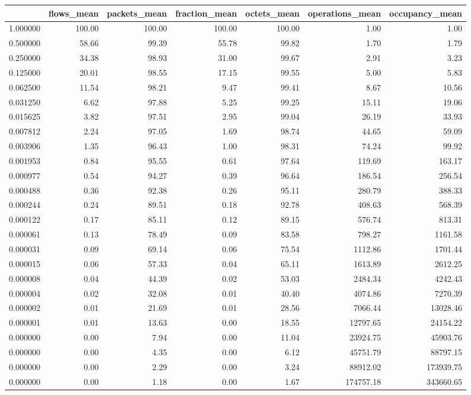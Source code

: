 \begin{tabular}{lrrrrrr}
\toprule
 & flows_mean & packets_mean & fraction_mean & octets_mean & operations_mean & occupancy_mean \\
\midrule
1.000000 & 100.00 & 100.00 & 100.00 & 100.00 & 1.00 & 1.00 \\
0.500000 & 58.66 & 99.39 & 55.78 & 99.82 & 1.70 & 1.79 \\
0.250000 & 34.38 & 98.93 & 31.00 & 99.67 & 2.91 & 3.23 \\
0.125000 & 20.01 & 98.55 & 17.15 & 99.55 & 5.00 & 5.83 \\
0.062500 & 11.54 & 98.21 & 9.47 & 99.41 & 8.67 & 10.56 \\
0.031250 & 6.62 & 97.88 & 5.25 & 99.25 & 15.11 & 19.06 \\
0.015625 & 3.82 & 97.51 & 2.95 & 99.04 & 26.19 & 33.93 \\
0.007812 & 2.24 & 97.05 & 1.69 & 98.74 & 44.65 & 59.09 \\
0.003906 & 1.35 & 96.43 & 1.00 & 98.31 & 74.24 & 99.92 \\
0.001953 & 0.84 & 95.55 & 0.61 & 97.64 & 119.69 & 163.17 \\
0.000977 & 0.54 & 94.27 & 0.39 & 96.64 & 186.54 & 256.54 \\
0.000488 & 0.36 & 92.38 & 0.26 & 95.11 & 280.79 & 388.33 \\
0.000244 & 0.24 & 89.51 & 0.18 & 92.78 & 408.63 & 568.39 \\
0.000122 & 0.17 & 85.11 & 0.12 & 89.15 & 576.74 & 813.31 \\
0.000061 & 0.13 & 78.49 & 0.09 & 83.58 & 798.27 & 1161.58 \\
0.000031 & 0.09 & 69.14 & 0.06 & 75.54 & 1112.86 & 1701.44 \\
0.000015 & 0.06 & 57.33 & 0.04 & 65.11 & 1613.89 & 2612.25 \\
0.000008 & 0.04 & 44.39 & 0.02 & 53.03 & 2484.34 & 4242.43 \\
0.000004 & 0.02 & 32.08 & 0.01 & 40.40 & 4074.86 & 7270.39 \\
0.000002 & 0.01 & 21.69 & 0.01 & 28.56 & 7066.44 & 13028.46 \\
0.000001 & 0.01 & 13.63 & 0.00 & 18.55 & 12797.65 & 24154.22 \\
0.000000 & 0.00 & 7.94 & 0.00 & 11.04 & 23924.75 & 45903.76 \\
0.000000 & 0.00 & 4.35 & 0.00 & 6.12 & 45751.79 & 88797.15 \\
0.000000 & 0.00 & 2.29 & 0.00 & 3.24 & 88912.02 & 173939.75 \\
0.000000 & 0.00 & 1.18 & 0.00 & 1.67 & 174757.18 & 343660.65 \\
\bottomrule
\end{tabular}
